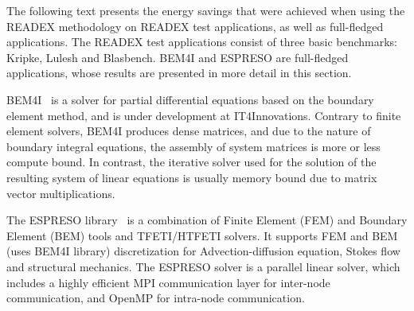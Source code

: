 

The following text presents the energy savings that were achieved when using the READEX methodology on READEX test applications, as well as full-fledged applications. The READEX test applications consist of three basic benchmarks: Kripke, Lulesh and Blasbench. BEM4I and ESPRESO are full-fledged applications, whose results are presented in more detail in this section. 

BEM4I~\cite{ch6_MerZap2013} is a solver for partial differential equations based on the boundary element method, and is under development at IT4Innovations. Contrary to finite element solvers, BEM4I produces dense matrices, and due to the nature of boundary integral equations, the assembly of system matrices is more or less compute bound. In contrast, the iterative solver used for the solution of the resulting system of linear equations is usually memory bound due to matrix vector multiplications.

The ESPRESO library~\cite{ESPRESOijhpca} is a combination of Finite Element (FEM) and Boundary Element (BEM) tools and TFETI/HTFETI solvers. It supports FEM and BEM (uses BEM4I library) discretization for Advection-diffusion equation, Sto\-kes flow and structural mechanics. The ESPRESO solver is a parallel linear solver, which includes a highly efficient MPI communication layer for inter-node communication, and OpenMP for intra-node communication.

